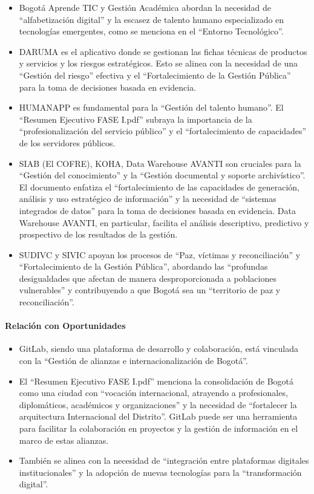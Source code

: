 \documentclass[
	a4paper, %
	12pt, %
]{include/CSSullivanBusinessReport}
\def\tightlist{}
\begin{document}
\begin{itemize}
\tightlist
\item
  Bogotá Aprende TIC y Gestión Académica abordan la necesidad de
  ``alfabetización digital'' y la escasez de talento humano
  especializado en tecnologías emergentes, como se menciona en el
  ``Entorno Tecnológico''.
\item
  DARUMA es el aplicativo donde se gestionan las fichas técnicas de
  productos y servicios y los riesgos estratégicos. Esto se alinea con
  la necesidad de una ``Gestión del riesgo'' efectiva y el
  ``Fortalecimiento de la Gestión Pública'' para la toma de decisiones
  basada en evidencia.
\item
  HUMANAPP es fundamental para la ``Gestión del talento humano''. El
  ``Resumen Ejecutivo FASE I.pdf'' subraya la importancia de la
  ``profesionalización del servicio público'' y el ``fortalecimiento de
  capacidades'' de los servidores públicos.
\item
  SIAB (El COFRE), KOHA, Data Warehouse AVANTI son cruciales para la
  ``Gestión del conocimiento'' y la ``Gestión documental y soporte
  archivístico''. El documento enfatiza el ``fortalecimiento de las
  capacidades de generación, análisis y uso estratégico de información''
  y la necesidad de ``sistemas integrados de datos'' para la toma de
  decisiones basada en evidencia. Data Warehouse AVANTI, en particular,
  facilita el análisis descriptivo, predictivo y prospectivo de los
  resultados de la gestión.
\item
  SUDIVC y SIVIC apoyan los procesos de ``Paz, víctimas y
  reconciliación'' y ``Fortalecimiento de la Gestión Pública'',
  abordando las ``profundas desigualdades que afectan de manera
  desproporcionada a poblaciones vulnerables'' y contribuyendo a que
  Bogotá sea un ``territorio de paz y reconciliación''.
\end{itemize}

\paragraph{Relación con
Oportunidades}\label{sec:relaciuxf3n-con-oportunidades}

\begin{itemize}
\tightlist
\item
  GitLab, siendo una plataforma de desarrollo y colaboración, está
  vinculada con la ``Gestión de alianzas e internacionalización de
  Bogotá''.
\item
  El ``Resumen Ejecutivo FASE I.pdf'' menciona la consolidación de
  Bogotá como una ciudad con ``vocación internacional, atrayendo a
  profesionales, diplomáticos, académicos y organizaciones'' y la
  necesidad de ``fortalecer la arquitectura Internacional del
  Distrito''. GitLab puede ser una herramienta para facilitar la
  colaboración en proyectos y la gestión de información en el marco de
  estas alianzas.
\item
  También se alinea con la necesidad de ``integración entre plataformas
  digitales institucionales'' y la adopción de nuevas tecnologías para
  la ``transformación digital''.
\end{itemize}
\end{document}
